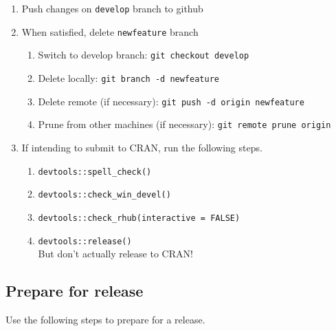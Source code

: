 \documentclass{article}
\begin{document}
\begin{enumerate}
  \item Push changes on \texttt{develop} branch to github
  \item When satisfied, delete \texttt{newfeature} branch
  \begin{enumerate}

    \item Switch to develop branch: \texttt{git checkout develop}

    \item Delete locally: \texttt{git branch -d newfeature}

    \item Delete remote (if necessary): \texttt{git push -d origin newfeature} 
	
	\item Prune from other machines (if necessary): \texttt{git remote prune origin} 

  \end{enumerate}
  
  \item If intending to submit to CRAN, 
        run the following steps.
  
  \begin{enumerate}
	  
    \item \verb+devtools::spell_check()+

    \item \verb+devtools::check_win_devel()+

    \item \verb+devtools::check_rhub(interactive = FALSE)+

    \item \verb+devtools::release()+ \\
          But don't actually release to CRAN!
            
  \end{enumerate}
\end{enumerate}


\subsection{Prepare for release} 
\label{sec:prep-for-release}

Use the following steps to prepare for a release.
\end{document}

